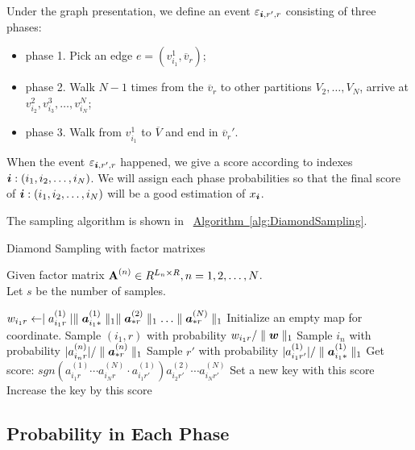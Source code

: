 \documentclass[letterpaper]{article}
\newcommand{\Sca}[3]{{#1}^{(#2)}_{i_#2#3}}%
\newcommand{\V}[1]{{\bm{{\MakeLowercase{#1}}}}}
\newcommand{\Varow}[1]{\V{a}^{(#1)}_{i_#1*}}
\newcommand{\Vacol}[1]{\V{a}^{(#1)}_{*r}}
\newcommand{\M}[1]{{\bm{\mathbf{\MakeUppercase{#1}}}}}
\newcommand{\norm}[2]{\parallel#1\parallel_{#2}}
\newcommand{\Alg}[1] {\hyperref[alg:#1] {Algorithm~\ref*{alg:#1}}}
\begin{document}
Under the graph presentation, we define an event $\varepsilon_{\V{i},r',r}$  consisting of three phases:
\begin{itemize}
  \item phase 1. Pick an edge $e=(v^1_{i_1},\overline{v}_r)$;
  \item phase 2. Walk $N-1$ times from the $\overline{v}_r$ to other partitions $V_2,\ldots,V_N$, arrive at $v^2_{i_2},v^3_{i_3},\ldots,v^N_{i_N}$;
  \item phase 3. Walk from $v^1_{i_1}$ to $\overline{V}$ and end in $\overline{v}_r'$.
\end{itemize}

When the event $\varepsilon_{\V{i},r',r}$ happened, we give a score according to indexes $\V{i}:(i_1,i_2,\ldots,i_N)$. We will assign each phase probabilities so that the final score of $\V{i}:(i_1,i_2,\ldots,i_N)$ will be a good estimation of $x_{\V{i}}$.

The sampling algorithm is shown in ~\Alg{DiamondSampling}.

\begin{algorithm}[t]
    \caption{Diamond Sampling with factor matrixes}
    \label{alg:DiamondSampling}
    Given factor matrix $\M{A}^{(n)}\in R^{L_n\times R}, n = 1,2,\ldots,N$.\\
    Let $s$ be the number of samples.
    \begin{algorithmic}[1]
    \State $w_{i_1r} \leftarrow \mid \Sca{a}{1}{r}\mid
    \norm{\Varow{1}}{1}\norm{\Vacol{2}}{1}\ldots\norm{\Vacol{N}}{1} $
    \EndFor
    \State Initialize an empty map for coordinate.
    \State Sample $(i_1,r)$ with probability $w_{i_1r}/\norm{\V{W}}{1}$        \label{line:phase1}
    \State Sample $i_n$ with probability $|\Sca{a}{n}{r}|/\norm{\Vacol{n}}{1}$
    \label{line:phase2}
    \EndFor
    \State Sample $r'$ with probability $|\Sca{a}{1}{r'}|/\norm{\Varow{1}}{1}$
    \label{line:phase3}
    \State \label{line:scoring}
        Get score: $sgn(\Sca{a}{1}{r}\cdots\Sca{a}{N}{r}\cdot\Sca{a}{1}{r'})
    \Sca{a}{2}{r'}\cdots\Sca{a}{N}{r'}$
    \State  Set a new key with this score
    \Else
    \State Increase the key by this score
    \EndIf
    \EndFor
    \end{algorithmic}
\end{algorithm}

\subsection{Probability in Each Phase}
\end{document}
